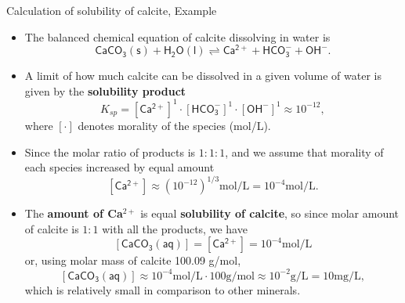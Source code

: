 \begin{frame}{Calculation of solubility of calcite, Example}
%
\footnotesize
\vskip 5pt
\begin{itemize}
\item The balanced chemical equation of calcite dissolving in water is
\[
\mathsf{CaCO_3(s) + H_2O(l) \rightleftharpoons Ca^{2+} + HCO^{-}_3 + OH^{-} }.
\]
\vskip -5pt
%
\pause
\item A limit of how much calcite can be dissolved in a given volume of water is given by the \alert{\bf solubility product}
%
\[
K_{sp} = [\mathsf{Ca^{2+}}]^1 \cdot [\mathsf{HCO^-_3}]^1 \cdot [\mathsf{OH^{-}}]^1 \approx 10^{-12},
\] 
where $[\cdot]$ denotes morality of the species (mol/L). 
\pause
%
%
%
\item Since the molar ratio of products is $1 : 1 : 1$, 
and we assume that morality of each species increased by equal amount 
%
\[
[\mathsf{Ca^{2+}}] \approx (10^{-12})^{1/3} \mbox{mol/L} = 10^{-4} \mbox{mol/L}.
\] 
\vskip -10pt
%
\pause
\item The \textbf{amount of Ca$^{2+}$} is equal \textbf{solubility of calcite}, so since molar amount of calcite is $1 : 1$ with all the products, we have
\[
[\mathsf{CaCO_3(aq)}] = [\mathsf{Ca^{2+}}] = 10^{-4} \mbox{mol/L} 
\]
%
or, using molar mass of calcite 100.09 g/mol,
%
\[
[\mathsf{CaCO_3(aq)}] \approx 10^{-4}  \mbox{mol/L} \cdot 100 \mbox{g/mol} 
\approx 10^{-2} \mbox{g/L}
= 10 \mbox{mg/L},
\]
%
which is relatively small in comparison to other minerals.
\end{itemize}
\end{frame}
%
%
